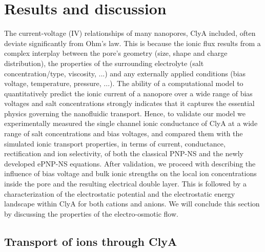 \documentclass[journal=ancac3,manuscript=article,etalmode=truncate,maxauthors=0,layout=twocolumn]{achemso}
\begin{document}



\section{Results and discussion}\label{sec:results}

The current-voltage (IV) relationships of many nanopores, ClyA included, often deviate significantly from
Ohm's law. This is because the ionic flux results from a complex interplay between the pore's geometry (size,
shape and charge distribution), the properties of the surrounding electrolyte (salt concentration/type,
viscosity, ...) and any externally applied conditions (bias voltage, temperature, pressure, ...). The ability
of a computational model to quantitatively predict the ionic current of a nanopore over a wide range of bias
voltages and salt concentrations strongly indicates that it captures the essential physics governing the
nanofluidic transport. Hence, to validate our model we experimentally measured the single channel ionic
conductance of ClyA at a wide range of salt concentrations and bias voltages, and compared them with the
simulated ionic transport properties, in terms of current, conductance, rectification and ion selectivity, of
both the classical PNP-NS and the newly developed ePNP-NS equations. After validation, we proceed with
describing the influence of bias voltage and bulk ionic strengths on the local ion concentrations inside the
pore and the resulting electrical double layer. This is followed by a characterization of the electrostatic
potential and the electrostatic energy landscape within ClyA for both cations and anions. We will conclude
this section by discussing the properties of the electro-osmotic flow.

\subsection{Transport of ions through ClyA}\label{sec:iont}


\end{document}
